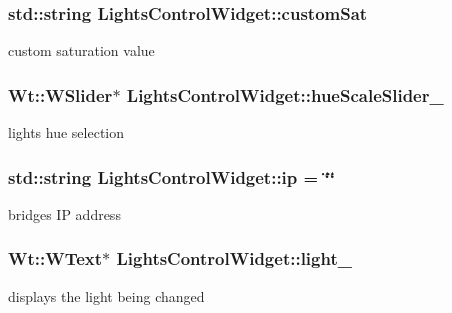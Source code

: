 \subsubsection[{\texorpdfstring{custom\+Sat}{customSat}}]{\setlength{\rightskip}{0pt plus 5cm}std\+::string Lights\+Control\+Widget\+::custom\+Sat\hspace{0.3cm}{\ttfamily [private]}}\hypertarget{classLightsControlWidget_ac19d3dd4895b03ccfe686cffd51c27fd}{}\label{classLightsControlWidget_ac19d3dd4895b03ccfe686cffd51c27fd}
custom saturation value 
\subsubsection[{\texorpdfstring{hue\+Scale\+Slider\+\_\+}{hueScaleSlider_}}]{\setlength{\rightskip}{0pt plus 5cm}Wt\+::\+W\+Slider$\ast$ Lights\+Control\+Widget\+::hue\+Scale\+Slider\+\_\+\hspace{0.3cm}{\ttfamily [private]}}\hypertarget{classLightsControlWidget_a71c03598de2481409316e7d1ca51fda0}{}\label{classLightsControlWidget_a71c03598de2481409316e7d1ca51fda0}
light\textquotesingle{}s hue selection 
\subsubsection[{\texorpdfstring{ip}{ip}}]{\setlength{\rightskip}{0pt plus 5cm}std\+::string Lights\+Control\+Widget\+::ip = \char`\"{}\char`\"{}\hspace{0.3cm}{\ttfamily [private]}}\hypertarget{classLightsControlWidget_aa2855e24d3d1afbcf6fcd2992abc47af}{}\label{classLightsControlWidget_aa2855e24d3d1afbcf6fcd2992abc47af}
bridge\textquotesingle{}s IP address 
\subsubsection[{\texorpdfstring{light\+\_\+}{light_}}]{\setlength{\rightskip}{0pt plus 5cm}Wt\+::\+W\+Text$\ast$ Lights\+Control\+Widget\+::light\+\_\+\hspace{0.3cm}{\ttfamily [private]}}\hypertarget{classLightsControlWidget_a071eae068aef8f47a36e728ae3ad6378}{}\label{classLightsControlWidget_a071eae068aef8f47a36e728ae3ad6378}
displays the light being changed 
